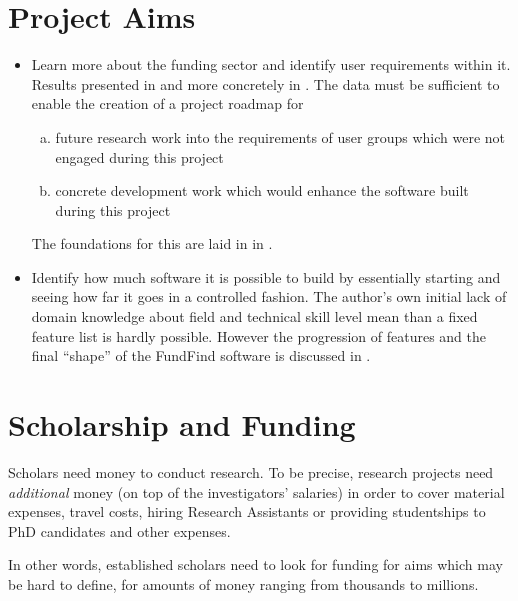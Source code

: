 
\section{Project Aims}
\begin{itemize}
 \item Learn more about the funding sector and identify user requirements within it. Results presented in  and more concretely in . The data must be sufficient to enable the creation of a project roadmap for
    \begin{enumerate}[a)]
    \item future research work into the requirements of user groups which were not engaged during this project
    \item concrete development work which would enhance the software built during this project
    \end{enumerate}
  The foundations for this are laid in in .
  
 \item Identify how much software it is possible to build by essentially starting and seeing how far it goes in a controlled fashion. The author's own initial lack of domain knowledge about field and technical skill level mean than a fixed feature list is hardly possible. However the progression of features and the final ``shape'' of the FundFind software is discussed in .
\end{itemize}

\section{Scholarship and Funding}
Scholars need money to conduct research. To be precise, research projects need \emph{additional} money (on top of the investigators' salaries) in order to cover material expenses, travel costs, hiring Research Assistants or providing studentships to PhD candidates and other expenses. 

In other words, established scholars need to look for funding for aims which may be hard to define, for amounts of money ranging from thousands to millions.

